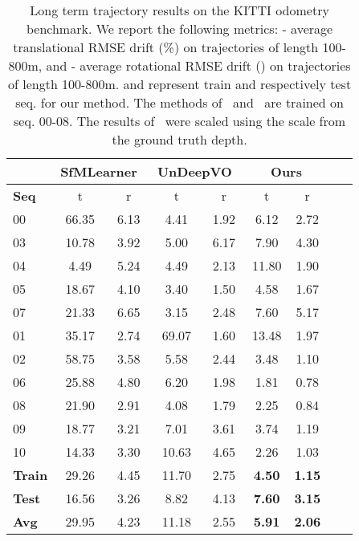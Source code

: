 \documentclass[letterpaper, 10 pt, conference]{ieeeconf}  \IEEEoverridecommandlockouts
\begin{document}
\begin{table}[!t]
\centering
{
\footnotesize
\setlength{\tabcolsep}{1.0em}
\begin{tabular}{l@{\hskip 1.5em}cc@{\hskip 1.5em}cc@{\hskip 1.5em}cc@{\hskip 1.5em}cc}



 & \multicolumn{2}{c}{SfMLearner~\cite{zhou2017unsupervised}} & \multicolumn{2}{c}{UnDeepVO~\cite{li2017undeepvo}}  & \multicolumn{2}{c}{Ours} \\
\toprule
\textbf{Seq} & t & r & t & r & t & r \\
\midrule
00  & 66.35 &  6.13 & 4.41 &  1.92 &  6.12 &  2.72  \\
03  & 10.78 &  3.92 & 5.00 &  6.17 &  7.90 &  4.30  \\
04  &  4.49 &  5.24 & 4.49 &  2.13 & 11.80 &  1.90  \\
05  & 18.67 &  4.10 & 3.40 &  1.50 &  4.58 &  1.67  \\
07  & 21.33 &  6.65 & 3.15 &  2.48 &  7.60 &  5.17  \\
\midrule
01        & 35.17 &  2.74 &69.07 &  1.60 & 13.48 &1.97  \\
02        & 58.75 &  3.58 & 5.58 &  2.44 & 3.48 & 1.10  \\
06        & 25.88 &  4.80 & 6.20 &  1.98 & 1.81 & 0.78  \\
08        & 21.90 &  2.91 & 4.08 &  1.79 & 2.25 & 0.84  \\
09        & 18.77 &  3.21 & 7.01 &  3.61 & 3.74 &  1.19  \\
10        & 14.33 &  3.30 &10.63 &  4.65 & 2.26 &  1.03\\
\midrule
\textbf{Train}   & 29.26 &  4.45 & 11.70 & 2.75 & \textbf{4.50} & \textbf{1.15} \\
\textbf{Test}   & 16.56 &  3.26 & 8.82 & 4.13 & \textbf{7.60} & \textbf{3.15}  \\
\textbf{Avg}   & 29.95 &  4.23 & 11.18 & 2.55 & \textbf{5.91} & \textbf{2.06}  \\
\bottomrule\end{tabular}\\\vspace{1mm}}
\caption{Long term trajectory results on the KITTI odometry benchmark. We report the following metrics:  - average translational RMSE drift (\%) on trajectories of length 100-800m, and  - average rotational RMSE drift () on trajectories of length 100-800m.  and  represent train and respectively test seq. for our method. The methods of~\cite{zhou2017unsupervised} and~\cite{li2017undeepvo} are trained on seq. 00-08.  The results of~\cite{zhou2017unsupervised} were scaled using the scale from the ground truth depth.}
\label{table:tajectory-accuracy}
\vspace{0mm}
\end{table}
\end{document}
